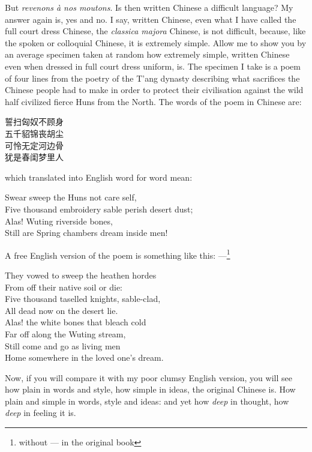 But \emph{revenons \`a nos moutons}.
Is then written Chinese a difficult language?
My answer again is, yes and no.
I say, written Chinese, even what I have called the full court dress Chinese, the \emph{classica majora} Chinese, is not difficult, because, like the spoken or colloquial Chinese, it is extremely simple.
Allow me to show you by an average specimen taken at random how extremely simple, written Chinese even when dressed in full court dress uniform, is.
The specimen I take is a poem of four lines from the poetry of the T'ang dynasty  describing what sacrifices the Chinese people had to make in order to protect their civilisation against the wild half civilized fierce Huns from the North.
The words of the poem in Chinese are:
\begin{center}
    誓扫匈奴不顾身 \\
    五千貂锦丧胡尘 \\
    可怜无定河边骨 \\
    犹是春闺梦里人 \\
\end{center}
which translated into English word for word mean:
\begin{center}
    Swear sweep the Huns not care self, \\
    Five thousand embroidery sable perish desert dust; \\
    Alas! Wuting riverside bones, \\
    Still are Spring chambers dream inside men!
\end{center}
A free English version of the poem is something like this: ---\footnote{without --- in the original book}
\begin{center}
    They vowed to sweep the heathen hordes \\
    From off their native soil or die: \\
    Five thousand taselled knights, sable-clad, \\
    All dead now on the desert lie. \\
    Alas! the white bones that bleach cold \\
    Far off along the Wuting stream, \\
    Still come and go as living men \\
    Home somewhere in the loved one's dream.
\end{center}

Now, if you will compare it with my poor clumsy English version, you will see how plain in words and style, how simple in ideas, the original Chinese is.
How plain and simple in words, style and ideas: and yet how \emph{deep} in thought, how \emph{deep} in feeling it is.

